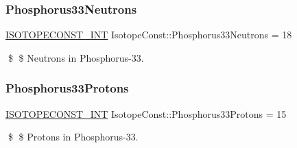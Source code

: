 \subsubsection{\texorpdfstring{Phosphorus33\+Neutrons}{Phosphorus33Neutrons}}
{\footnotesize\ttfamily \mbox{\hyperlink{group___isotope_const-_macros_ga5f18360b3e99483a35c32d789e62621c}{I\+S\+O\+T\+O\+P\+E\+C\+O\+N\+S\+T\+\_\+\+I\+NT}} Isotope\+Const\+::\+Phosphorus33\+Neutrons = 18}

\$ \$ Neutrons in Phosphorus-\/33. \mbox{\label{group___isotope_const-_phosphorus-_p33_ga9e853d612c14c6d0839bfcb340a04b0b}} 
\subsubsection{\texorpdfstring{Phosphorus33\+Protons}{Phosphorus33Protons}}
{\footnotesize\ttfamily \mbox{\hyperlink{group___isotope_const-_macros_ga5f18360b3e99483a35c32d789e62621c}{I\+S\+O\+T\+O\+P\+E\+C\+O\+N\+S\+T\+\_\+\+I\+NT}} Isotope\+Const\+::\+Phosphorus33\+Protons = 15}

\$ \$ Protons in Phosphorus-\/33. 